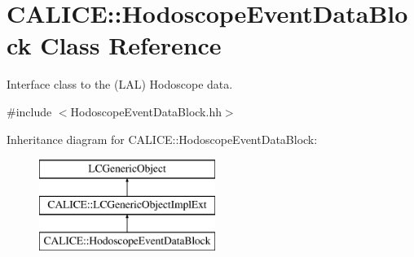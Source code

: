 \section{C\-A\-L\-I\-C\-E\-:\-:Hodoscope\-Event\-Data\-Block Class Reference}
\label{classCALICE_1_1HodoscopeEventDataBlock}


Interface class to the (L\-A\-L) Hodoscope data.  




{\ttfamily \#include $<$Hodoscope\-Event\-Data\-Block.\-hh$>$}

Inheritance diagram for C\-A\-L\-I\-C\-E\-:\-:Hodoscope\-Event\-Data\-Block\-:\begin{figure}[H]
\begin{center}
\leavevmode
\includegraphics[height=3.000000cm]{classCALICE_1_1HodoscopeEventDataBlock}
\end{center}
\end{figure}
